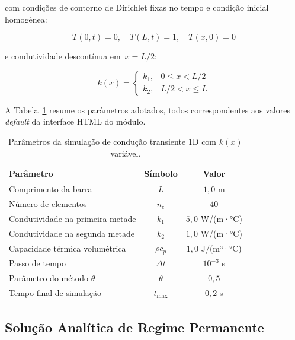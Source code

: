 \noindent com condições de contorno de Dirichlet fixas no tempo e condição inicial homogênea:

\begin{equation}
    T(0, t) = 0, \quad T(L, t) = 1, \quad T(x, 0) = 0
    \label{eq:val_calor_transiente_cc}
\end{equation}

\noindent e condutividade descontínua em~$x = L/2$:

\begin{equation}
    k(x) = \begin{cases} k_1, & 0 \leq x < L/2 \\ k_2, & L/2 < x \leq L \end{cases}
    \label{eq:val_calor_transiente_k}
\end{equation}

A Tabela~\ref{tab:val_calor_transiente_params} resume os parâmetros adotados, todos correspondentes aos valores \emph{default} da interface HTML do módulo.

\begin{table}[htbp]
    \centering
    \caption{Parâmetros da simulação de condução transiente 1D com $k(x)$ variável.}
    \label{tab:val_calor_transiente_params}
    \begin{tabular}{lcc}
        \hline
        \textbf{Parâmetro} & \textbf{Símbolo} & \textbf{Valor} \\
        \hline
        Comprimento da barra           & $L$          & $1{,}0$ m            \\
        Número de elementos            & $n_e$        & $40$                 \\
        Condutividade na primeira metade & $k_1$      & $5{,}0$ W/(m·°C)     \\
        Condutividade na segunda metade  & $k_2$      & $1{,}0$ W/(m·°C)     \\
        Capacidade térmica volumétrica & $\rho c_p$   & $1{,}0$ J/(m³·°C)    \\
        Passo de tempo                 & $\Delta t$   & $10^{-3}$ s          \\
        Parâmetro do método $\theta$   & $\theta$     & $0{,}5$              \\
        Tempo final de simulação       & $t_{\max}$   & $0{,}2$ s            \\
        \hline
    \end{tabular}
\end{table}

\subsection{Solução Analítica de Regime Permanente}


